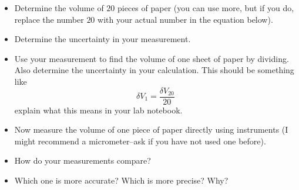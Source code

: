 \documentclass[twoside,11pt,ShortChapTitles]{BYUTextbook}
\begin{document}
\begin{itemize}
\item Determine the volume of $20$ pieces of paper (you can use more, but if
you do, replace the number $20$ with your actual number in the equation below).

\item Determine the uncertainty in your measurement.

\item Use your measurement to find the volume of one sheet of paper by
dividing. Also determine the uncertainty in your calculation. This should be
something like
\[
\delta V_{1}=\frac{\delta V_{20}}{20}
\]
explain what this means in your lab notebook.

\item Now measure the volume of one piece of paper directly using instruments
(I might recommend a micrometer--ask if you have not used one before).

\item How do your measurements compare?

\item Which one is more accurate? Which is more precise? Why?
\end{itemize}
\end{document}
